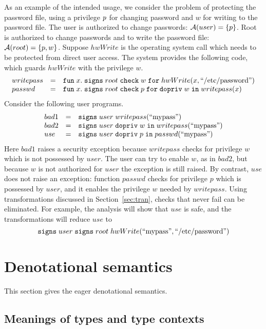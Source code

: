 \documentclass[submission,copyright,creativecommons]{eptcs}
\newcommand{\enable}[2]{\ENABLE\;#1\;\IN\;#2}
\newcommand{\chk}[2]{\CHK\;#1\;\FOR\;#2}
\newcommand{\signs}[2]{\SIGNS\;#1\;#2}
\newcommand{\FOR}{\mbox{\texttt{for}}}
\newcommand{\IN}{\mbox{\texttt{in}}}
\newcommand{\A}{\mathcal{A}}
\newcommand{\ENABLE}{\mbox{\texttt{dopriv}}}
\newcommand{\CHK}{\mbox{\texttt{check}}}
\newcommand{\SIGNS}{\mbox{\texttt{signs}}}
\newcommand{\LAM}[2]{{\mathtt{fun}\; #1.\; #2}}
\begin{document}
As an example of the intended usage, we consider the problem of protecting the
password file, using a privilege $p$ for changing password and $w$ for writing to
the password file.
The user is authorized to change passwords:
$\A(user)=\{ \p\}$.
Root is authorized to change passwords and to write the password file:
$\A(root)=\{ \p, w \}$.
Suppose $hwWrite$ is the operating system call which needs to be protected from
direct user access. The system provides the following code, which guards
$hwWrite$ with the privilege $w$.
\[ 
\begin{array}{lcl}
writepass &=&
\LAM{x}{\signs{root}{\chk{w}{hwWrite(x,\mbox{``/etc/password''})}}} \\
passwd &=& \LAM{x}{\signs{root}{\chk{p}{\enable{w}{writepass(x)}}}}  
\end{array}
\]
Consider the following user programs.
\[ 
\begin{array}{lcl}
bad1 &=& \signs{user}{writepass(\mbox{``mypass''})}\\
bad2 &=& \signs{user}{\enable{w}{writepass(\mbox{``mypass''})}} \\ 
use &=& \signs{user}{\enable{\p}{passwd(\mbox{``mypass''})}} 
\end{array}
\]
Here $bad1$ raises a security exception because $writepass$ checks for privilege $w$
which is not possessed by $user$.  The user can try to enable $w$, as in $bad2$, but
because $w$ is not authorized for $user$ the exception is still raised.  By contrast,
$use$ does not raise an exception: function $passwd$ checks for privilege $p$
which is possessed by $user$, and it enables the privilege $w$ needed by
$writepass$.  
Using transformations discussed in Section~\ref{sec:tran}, checks that never fail can
be eliminated. 
For example, the analysis will show that $use$ is safe, and the transformations will
reduce $use$ to 
\[ \signs{user}{ \signs{root}{ 
               hwWrite(\mbox{``mypass''},\mbox{``/etc/password''})}} 
\]





\section{Denotational semantics}
\label{sec:ds}


This section gives the eager denotational semantics. 

\subsection{Meanings of types and type contexts}
\end{document}
